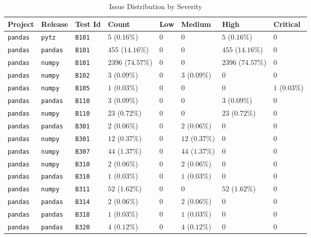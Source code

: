 \begin{table}
\caption{Issue Distribution by Severity}
\label{tab:issue-distribution}
\begin{tabular}{llllllll}
\toprule
Project & Release & Test Id & Count & Low & Medium & High & Critical \\
\midrule
\texttt{pandas} & \texttt{pytz} & \texttt{B101} & $5$ ($0.16\%$) & $0$ & $0$ & $5$ ($0.16\%$) & $0$ \\
\texttt{pandas} & \texttt{pandas} & \texttt{B101} & $455$ ($14.16\%$) & $0$ & $0$ & $455$ ($14.16\%$) & $0$ \\
\texttt{pandas} & \texttt{numpy} & \texttt{B101} & $2396$ ($74.57\%$) & $0$ & $0$ & $2396$ ($74.57\%$) & $0$ \\
\texttt{pandas} & \texttt{numpy} & \texttt{B102} & $3$ ($0.09\%$) & $0$ & $3$ ($0.09\%$) & $0$ & $0$ \\
\texttt{pandas} & \texttt{numpy} & \texttt{B105} & $1$ ($0.03\%$) & $0$ & $0$ & $0$ & $1$ ($0.03\%$) \\
\texttt{pandas} & \texttt{pandas} & \texttt{B110} & $3$ ($0.09\%$) & $0$ & $0$ & $3$ ($0.09\%$) & $0$ \\
\texttt{pandas} & \texttt{numpy} & \texttt{B110} & $23$ ($0.72\%$) & $0$ & $0$ & $23$ ($0.72\%$) & $0$ \\
\texttt{pandas} & \texttt{pandas} & \texttt{B301} & $2$ ($0.06\%$) & $0$ & $2$ ($0.06\%$) & $0$ & $0$ \\
\texttt{pandas} & \texttt{numpy} & \texttt{B301} & $12$ ($0.37\%$) & $0$ & $12$ ($0.37\%$) & $0$ & $0$ \\
\texttt{pandas} & \texttt{numpy} & \texttt{B307} & $44$ ($1.37\%$) & $0$ & $44$ ($1.37\%$) & $0$ & $0$ \\
\texttt{pandas} & \texttt{numpy} & \texttt{B310} & $2$ ($0.06\%$) & $0$ & $2$ ($0.06\%$) & $0$ & $0$ \\
\texttt{pandas} & \texttt{pandas} & \texttt{B310} & $1$ ($0.03\%$) & $0$ & $1$ ($0.03\%$) & $0$ & $0$ \\
\texttt{pandas} & \texttt{numpy} & \texttt{B311} & $52$ ($1.62\%$) & $0$ & $0$ & $52$ ($1.62\%$) & $0$ \\
\texttt{pandas} & \texttt{pandas} & \texttt{B314} & $2$ ($0.06\%$) & $0$ & $2$ ($0.06\%$) & $0$ & $0$ \\
\texttt{pandas} & \texttt{pandas} & \texttt{B318} & $1$ ($0.03\%$) & $0$ & $1$ ($0.03\%$) & $0$ & $0$ \\
\texttt{pandas} & \texttt{pandas} & \texttt{B320} & $4$ ($0.12\%$) & $0$ & $4$ ($0.12\%$) & $0$ & $0$ \\

\end{tabular}
\end{table}
